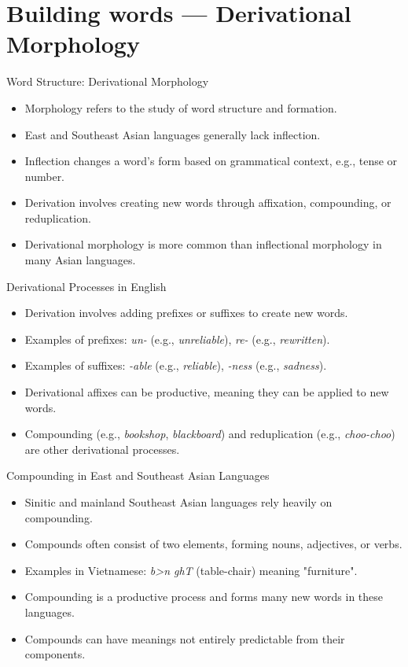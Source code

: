 \documentclass{beamer}
\begin{document}
\section{Building words --- Derivational Morphology}


\begin{frame}{Word Structure: Derivational Morphology}
    \begin{itemize}
        \item Morphology refers to the study of word structure and formation.
        \item East and Southeast Asian languages generally lack inflection.
        \item Inflection changes a word's form based on grammatical context, e.g., tense or number.
        \item Derivation involves creating new words through affixation, compounding, or reduplication.
        \item Derivational morphology is more common than inflectional morphology in many Asian languages.
    \end{itemize}
\end{frame}

\begin{frame}{Derivational Processes in English}
    \begin{itemize}
        \item Derivation involves adding prefixes or suffixes to create new words.
        \item Examples of prefixes: \textit{un-} (e.g., \textit{unreliable}), \textit{re-} (e.g., \textit{rewritten}).
        \item Examples of suffixes: \textit{-able} (e.g., \textit{reliable}), \textit{-ness} (e.g., \textit{sadness}).
        \item Derivational affixes can be productive, meaning they can be applied to new words.
        \item Compounding (e.g., \textit{bookshop}, \textit{blackboard}) and reduplication (e.g., \textit{choo-choo}) are other derivational processes.
    \end{itemize}
\end{frame}

\begin{frame}{Compounding in East and Southeast Asian Languages}
    \begin{itemize}
        \item Sinitic and mainland Southeast Asian languages rely heavily on compounding.
        \item Compounds often consist of two elements, forming nouns, adjectives, or verbs.
        \item Examples in Vietnamese: \textit{b>n ghT} (table-chair) meaning "furniture".
        \item Compounding is a productive process and forms many new words in these languages.
        \item Compounds can have meanings not entirely predictable from their components.
    \end{itemize}
\end{frame}
\end{document}
